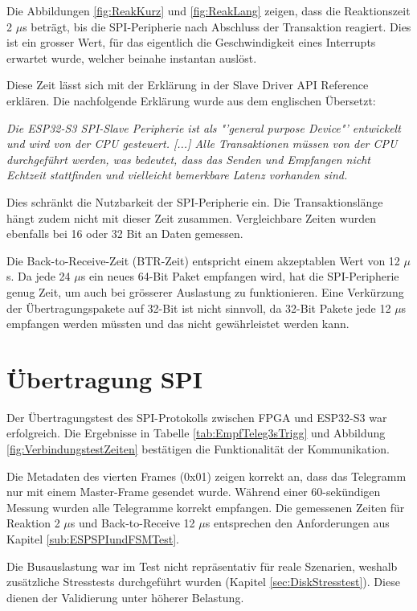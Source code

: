 Die Abbildungen \ref{fig:ReakKurz} und \ref{fig:ReakLang} zeigen, dass die Reaktionszeit 2 $\mu$s beträgt, bis die SPI-Peripherie nach Abschluss der Transaktion reagiert. Dies ist ein grosser Wert, für das eigentlich die Geschwindigkeit eines Interrupts erwartet wurde, welcher beinahe instantan auslöst.

Diese Zeit lässt sich mit der Erklärung in der Slave Driver API Reference erklären. Die nachfolgende Erklärung wurde aus dem englischen Übersetzt: 

\textit{Die ESP32-S3 SPI-Slave Peripherie ist als "'general purpose Device"' entwickelt und wird von der CPU gesteuert. [...] Alle Transaktionen müssen von der CPU durchgeführt werden, was bedeutet, dass das Senden und Empfangen nicht Echtzeit stattfinden und vielleicht bemerkbare Latenz vorhanden sind.} \cite{SPI_SLAVE_DRIVER_API}

Dies schränkt die Nutzbarkeit der SPI-Peripherie ein. Die Transaktionslänge hängt zudem nicht mit dieser Zeit zusammen. Vergleichbare Zeiten wurden ebenfalls bei 16 oder 32 Bit an Daten gemessen. 

Die Back-to-Receive-Zeit (BTR-Zeit) entspricht einem akzeptablen Wert von 12 $\mu$s. Da jede 24 $\mu$s ein neues 64-Bit Paket empfangen wird, hat die SPI-Peripherie genug Zeit, um auch bei grösserer Auslastung zu funktionieren. Eine Verkürzung der Übertragungspakete auf 32-Bit ist nicht sinnvoll, da 32-Bit Pakete jede 12 $\mu$s empfangen werden müssten und das nicht gewährleistet werden kann. 

\section{Übertragung SPI}
\label{sec:DiskussionÜbertragungSPI}

Der Übertragungstest des SPI-Protokolls zwischen FPGA und ESP32-S3 war erfolgreich. Die Ergebnisse in Tabelle \ref{tab:EmpfTeleg3sTrigg} und Abbildung \ref{fig:VerbindungstestZeiten} bestätigen die Funktionalität der Kommunikation.

Die Metadaten des vierten Frames (0x01) zeigen korrekt an, dass das Telegramm nur mit einem Master-Frame gesendet wurde. Während einer 60-sekündigen Messung wurden alle Telegramme korrekt empfangen. Die gemessenen Zeiten für Reaktion 2 $\mu$s und Back-to-Receive 12 $\mu$s entsprechen den Anforderungen aus Kapitel \ref{sub:ESPSPIundFSMTest}.

Die Busauslastung war im Test nicht repräsentativ für reale Szenarien, weshalb zusätzliche Stresstests durchgeführt wurden (Kapitel \ref{sec:DiskStresstest}). Diese dienen der Validierung unter höherer Belastung.

